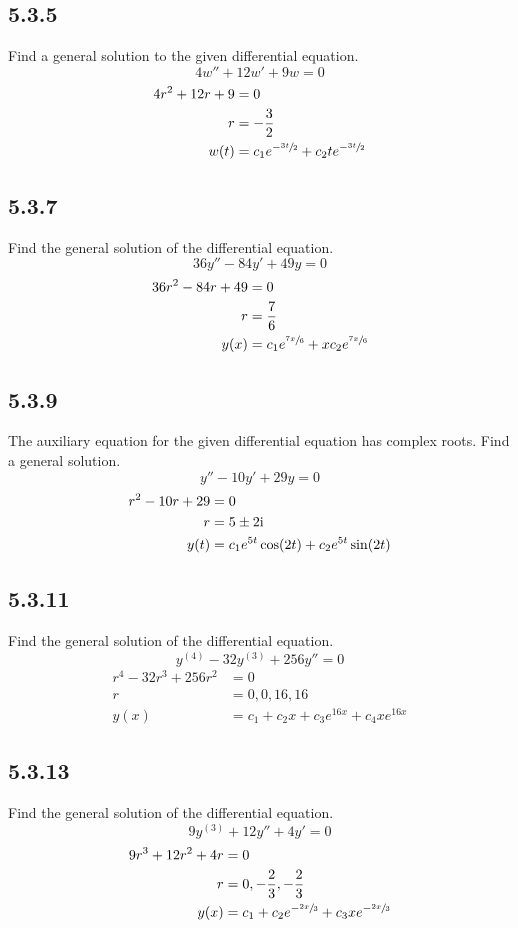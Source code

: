 \documentclass{article}
\begin{document}
\subsection{5.3.5}
Find a general solution to the given differential equation.
$$ 4w'' + 12w' + 9w = 0 $$
\begin{align*}
	4r^2 + 12r + 9 & = 0 \\
	r & = -\frac{3}{2} \\
	w(t) & = c_1e^{-\sfrac{3t}{2}} + c_2te^{-\sfrac{3t}{2}}
\end{align*}

\subsection{5.3.7}
Find the general solution of the differential equation.
$$ 36y'' - 84y' + 49y = 0 $$
\begin{align*}
	36r^2 - 84r + 49 & = 0 \\
	r & = \frac{7}{6} \\
	y(x) & = c_1e^{\sfrac{7x}{6}} + xc_2e^{\sfrac{7x}{6}}
\end{align*}

\subsection{5.3.9}
The auxiliary equation for the given differential equation has complex roots. Find a general solution.
$$ y'' - 10y' + 29y = 0 $$
\begin{align*}
	r^2 - 10r + 29 & = 0 \\
	r & = 5 \pm 2\mathrm{i}\mkern1mu \\
	y(t) & = c_1e^{5t}\cos(2t) + c_2e^{5t}\sin(2t)
\end{align*}

\subsection{5.3.11}
Find the general solution of the differential equation.
$$ y^{(4)} - 32y^{(3)} + 256y'' = 0 $$
\begin{align*}
	r^4 - 32r^3 + 256r^2 & = 0 \\
	r & = 0, 0, 16, 16 \\
	y(x) & = c_1 + c_2x + c_3e^{16x} + c_4xe^{16x}
\end{align*}

\subsection{5.3.13}
Find the general solution of the differential equation.
$$ 9y^{(3)} + 12y'' + 4y' = 0 $$
\begin{align*}
	9r^3 + 12r^2 + 4r & = 0 \\
	r & = 0, -\frac{2}{3}, -\frac{2}{3} \\
	y(x) & = c_1 + c_2e^{-\sfrac{2x}{3}} + c_3xe^{-\sfrac{2x}{3}}
\end{align*}
\end{document}
